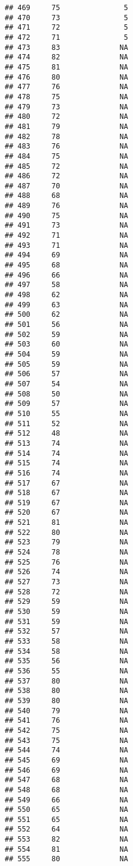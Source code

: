 \documentclass[]{article}
\begin{document}
\begin{verbatim}
## 469     75               5
## 470     73               5
## 471     72               5
## 472     71               5
## 473     83              NA
## 474     82              NA
## 475     81              NA
## 476     80              NA
## 477     76              NA
## 478     75              NA
## 479     73              NA
## 480     72              NA
## 481     79              NA
## 482     78              NA
## 483     76              NA
## 484     75              NA
## 485     72              NA
## 486     72              NA
## 487     70              NA
## 488     68              NA
## 489     76              NA
## 490     75              NA
## 491     73              NA
## 492     71              NA
## 493     71              NA
## 494     69              NA
## 495     68              NA
## 496     66              NA
## 497     58              NA
## 498     62              NA
## 499     63              NA
## 500     62              NA
## 501     56              NA
## 502     59              NA
## 503     60              NA
## 504     59              NA
## 505     59              NA
## 506     57              NA
## 507     54              NA
## 508     50              NA
## 509     57              NA
## 510     55              NA
## 511     52              NA
## 512     48              NA
## 513     74              NA
## 514     74              NA
## 515     74              NA
## 516     74              NA
## 517     67              NA
## 518     67              NA
## 519     67              NA
## 520     67              NA
## 521     81              NA
## 522     80              NA
## 523     79              NA
## 524     78              NA
## 525     76              NA
## 526     74              NA
## 527     73              NA
## 528     72              NA
## 529     59              NA
## 530     59              NA
## 531     59              NA
## 532     57              NA
## 533     58              NA
## 534     58              NA
## 535     56              NA
## 536     55              NA
## 537     80              NA
## 538     80              NA
## 539     80              NA
## 540     79              NA
## 541     76              NA
## 542     75              NA
## 543     75              NA
## 544     74              NA
## 545     69              NA
## 546     69              NA
## 547     68              NA
## 548     68              NA
## 549     66              NA
## 550     65              NA
## 551     65              NA
## 552     64              NA
## 553     82              NA
## 554     81              NA
## 555     80              NA

\end{verbatim}
\end{document}
